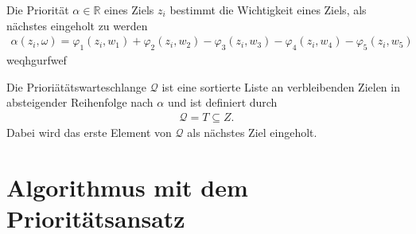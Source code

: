 \documentclass[german,version-2019-11]{uzl-thesis}
\begin{document}
\begin{definition}
Die Priorität $\alpha\in\mathbb{R}$ eines Ziels $z_i$ bestimmt die Wichtigkeit eines Ziels, als nächstes eingeholt zu werden
\begin{align*}
\alpha(z_i, \omega) = \varphi_1(z_i,w_1) + \varphi_2(z_i,w_2) - \varphi_3(z_i,w_3) - \varphi_4(z_i,w_4) - \varphi_5(z_i,w_5)
\end{align*}
weqhgurfwef
\end{definition}

\begin{definition}
Die Prioriätätswarteschlange $\mathcal{Q}$ ist eine sortierte Liste an verbleibenden Zielen in absteigender Reihenfolge nach $\alpha$ und ist definiert durch
\begin{align*}
\mathcal{Q} = T\subseteq Z.
\end{align*}
Dabei wird das erste Element von $\mathcal{Q}$ als nächstes Ziel eingeholt.
\end{definition}


\section{Algorithmus mit dem Prioritätsansatz}
\end{document}
